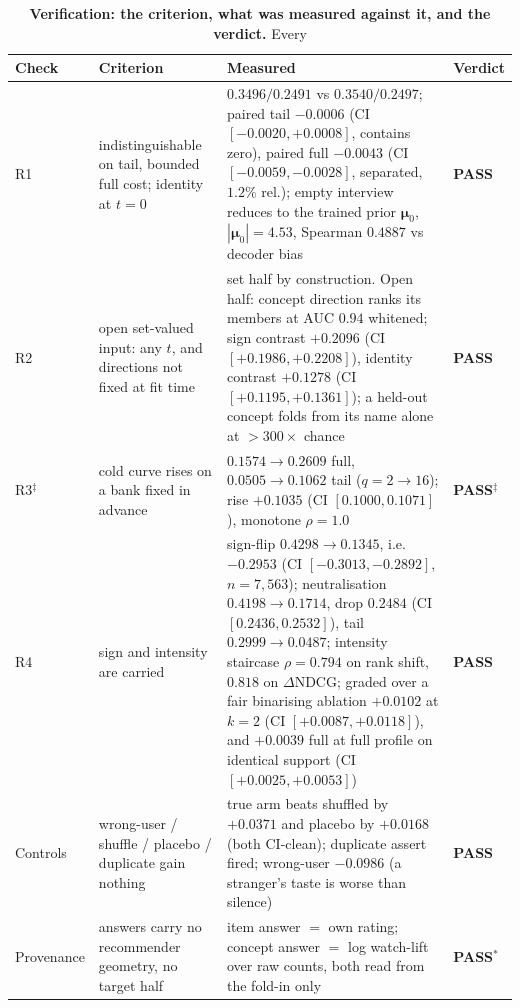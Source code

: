 \documentclass[11pt]{article}
\newcommand{\bmu}{\boldsymbol{\mu}}
\begin{document}
\begin{table}[t]\centering\small
\setlength{\tabcolsep}{4pt}
\renewcommand{\arraystretch}{1.15}
\begin{tabular}{p{1.95cm}p{4.1cm}p{5.95cm}p{1.35cm}}
\toprule
Check & Criterion & Measured & Verdict \\
\midrule
R1 & indistinguishable on tail, bounded full cost; identity at $t{=}0$ & $0.3496/0.2491$ vs $0.3540/0.2497$; paired tail $-0.0006$ (CI $[-0.0020,+0.0008]$, contains zero), paired full $-0.0043$ (CI $[-0.0059,-0.0028]$, separated, $1.2\%$ rel.); empty interview reduces to the trained prior $\bmu_0$, $|\bmu_0|{=}4.53$, Spearman $0.4887$ vs decoder bias & \textbf{PASS} \\
R2 & open set-valued input: any $t$, and directions not fixed at fit time & set half by construction. Open half: concept direction ranks its members at AUC $0.94$ whitened; sign contrast $+0.2096$ (CI $[+0.1986,+0.2208]$), identity contrast $+0.1278$ (CI $[+0.1195,+0.1361]$); a held-out concept folds from its name alone at $>300\times$ chance & \textbf{PASS} \\
R3$^\ddagger$ & cold curve rises on a bank fixed in advance & $0.1574\!\to\!0.2609$ full, $0.0505\!\to\!0.1062$ tail ($q{=}2\!\to\!16$); rise $+0.1035$ (CI $[0.1000,0.1071]$), monotone $\rho{=}1.0$ & \textbf{PASS}$^\ddagger$ \\
R4 & sign and intensity are carried & sign-flip $0.4298\!\to\!0.1345$, i.e.\ $-0.2953$ (CI $[-0.3013,-0.2892]$, $n{=}7{,}563$); neutralisation $0.4198\!\to\!0.1714$, drop $0.2484$ (CI $[0.2436,0.2532]$), tail $0.2999\!\to\!0.0487$; intensity staircase $\rho{=}0.794$ on rank shift, $0.818$ on $\Delta$NDCG; graded over a fair binarising ablation $+0.0102$ at $k{=}2$ (CI $[+0.0087,+0.0118]$), and $+0.0039$ full at full profile on identical support (CI $[+0.0025,+0.0053]$) & \textbf{PASS} \\
\midrule
Controls & wrong-user / shuffle / placebo / duplicate gain nothing & true arm beats shuffled by $+0.0371$ and placebo by $+0.0168$ (both CI-clean); duplicate assert fired; wrong-user $-0.0986$ (a stranger's taste is worse than silence) & \textbf{PASS} \\
Provenance & answers carry no recommender geometry, no target half & item answer $=$ own rating; concept answer $=$ log watch-lift over raw counts, both read from the fold-in only & \textbf{PASS}$^{*}$ \\
\bottomrule
\end{tabular}
\caption{\textbf{Verification: the criterion, what was measured against it, and the verdict.} Every
}
\end{table}
\end{document}
